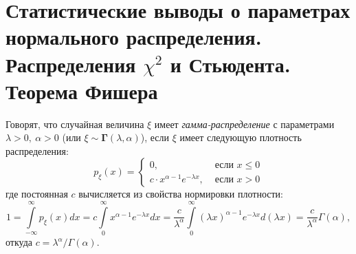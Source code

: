 \section{Статистические выводы о параметрах нормального распределения. Распределения \texorpdfstring{$\chi^{2}$}{хи-квадрат} и Стьюдента. Теорема Фишера}

\begin{defn}
    Говорят, что случайная величина $\xi$ имеет \textit{гамма-распределение} с параметрами $\lambda > 0,~ \alpha > 0$ (или $\xi \sim \mathbf{\Gamma}(\lambda, \alpha)$), 
    если $\xi$ имеет следующую плотность распределения:
    \begin{equation*}
        p_{\xi}(x) = \begin{cases}
            0, & \text { если } x \leqslant 0 \\
            c \cdot x^{\alpha-1} e^{-\lambda x}, & \text { если } x>0
        \end{cases}
    \end{equation*}
    где постоянная $c$ вычисляется из свойства нормировки плотности:
    \begin{equation*}
        1 = 
        \int\limits_{-\infty}^{\infty} p_{\xi}(x) d x = 
        c \int\limits_{0}^{\infty} x^{\alpha-1} e^{-\lambda x} d x = 
        \frac{c}{\lambda^{\alpha}} \int\limits_{0}^{\infty}(\lambda x)^{\alpha-1} e^{-\lambda x} d(\lambda x) = 
        \frac{c}{\lambda^{\alpha}} \Gamma(\alpha),
    \end{equation*}
    откуда $c=\lambda^{\alpha} / \Gamma(\alpha)$.
\end{defn}

